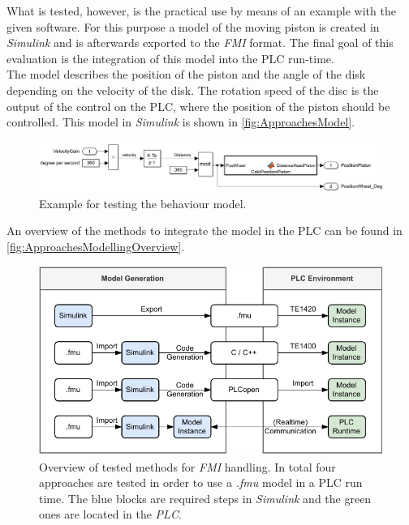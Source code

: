     What is tested, however, is the practical use by means of an example with the given software. For this purpose a model of the moving piston is created in \textit{Simulink} and is afterwards exported to the \textit{FMI} format. The final goal of this evaluation is the integration of this model into the PLC run-time. \\
    The model describes the position of the piston and the angle of the disk depending on the velocity of the disk. The rotation speed of the disc is the output of the control on the PLC, where the position of the piston should be controlled. This model in \textit{Simulink} is shown in \autoref{fig:ApproachesModel}. 
	\begin{figure}[htp]
		\centering
		\includegraphics[width=.99\linewidth]{figures/ApproachModelInSimulink.PNG}
		\caption{Example for testing the behaviour model.} 
		\label{fig:ApproachesModel}
	\end{figure}
	
    An overview of the methods to integrate the model in the PLC can be found in \autoref{fig:ApproachesModellingOverview}.
	\begin{figure}[htp]
		\centering
		\includegraphics{figures/MethodsOverviewModel.pdf}
		\caption[Overview of tested methods for \textit{FMI} handling.] {Overview of tested methods for \textit{FMI} handling. In total four approaches are tested in order to use a \textit{.fmu} model in a PLC run time. The blue blocks are required steps in \textit{Simulink} and the green ones are located in the \textit{PLC}.} 
		\label{fig:ApproachesModellingOverview}
	\end{figure}
	
